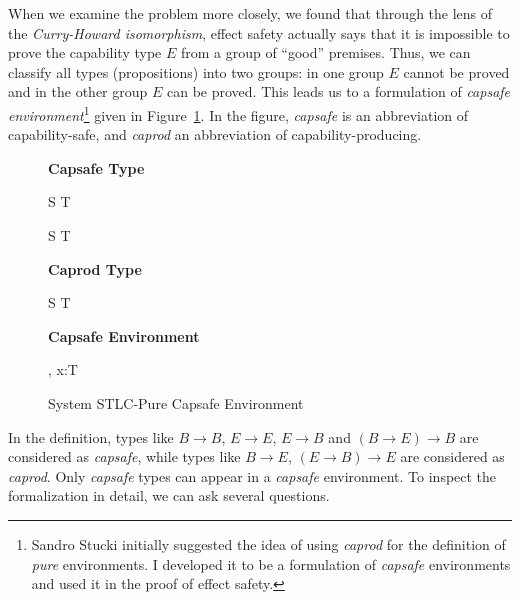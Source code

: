 When we examine the problem more closely, we found that through the
lens of the \emph{Curry-Howard isomorphism}, effect safety actually
says that it is impossible to prove the capability type $E$ from a
group of ``good'' premises. Thus, we can classify all types
(propositions) into two groups: in one group $E$ cannot be proved and
in the other group $E$ can be proved. This leads us to a formulation
of \emph{capsafe environment}\footnote{Sandro Stucki initially
  suggested the idea of using \emph{caprod} for the definition of
  \emph{pure} environments. I developed it to be a formulation of
  \emph{capsafe} environments and used it in the proof of effect
  safety.} given in Figure~\ref{fig:stlc-pure-capsafe-definition}. In
the figure, \emph{capsafe} is an abbreviation of capability-safe, and
\emph{caprod} an abbreviation of capability-producing.

\begin{figure}[h]
\begin{framed}

\setlength{\columnseprule}{0.4pt}
\begin{multicols}{2}

\textbf{Capsafe Type}


{ S \to T \quad {} }

{ S \to T \quad {} }

\columnbreak

\textbf{Caprod Type}


{ S \to T \quad {} }

\textbf{Capsafe Environment}


{ \Gamma, \; x:T \quad {} }


\end{multicols}
\end{framed}

\caption{System STLC-Pure Capsafe Environment}
\label{fig:stlc-pure-capsafe-definition}
\end{figure}

In the definition, types like $B \to B$, $E \to E$, $E \to B$ and
$(B \to E) \to B$ are considered as \emph{capsafe}, while types like
$B \to E$, $(E \to B) \to E$ are considered as \emph{caprod}. Only
\emph{capsafe} types can appear in a \emph{capsafe} environment. To
inspect the formalization in detail, we can ask several questions.

